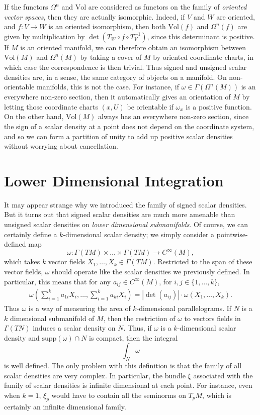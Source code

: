 If the functors $\Omega^n$ and $\text{Vol}$ are considered as functors on the family of \emph{oriented vector spaces}, then they are actually isomorphic. Indeed, if $V$ and $W$ are oriented, and $f: V \to W$ is an oriented isomorphism, then both $\text{Vol}(f)$ and $\Omega^n(f)$ are given by multiplication by $\det(T_W \circ f \circ T_V^{-1})$, since this determinant is positive. If $M$ is an oriented manifold, we can therefore obtain an isomorphism between $\text{Vol}(M)$ and $\Omega^n(M)$ by taking a cover of $M$ by oriented coordinate charts, in which case the correspondence is then trivial. Thus signed and unsigned scalar densities are, in a sense, the same category of objects on a manifold. On non-orientable manifolds, this is not the case. For instance, if $\omega \in \Gamma(\Omega^n(M))$ is an everywhere non-zero section, then it automatically gives an orientation of $M$ by letting those coordinate charts $(x,U)$ be orientable if $\omega_x$ is a positive function. On the other hand, $\text{Vol}(M)$ always has an everywhere non-zero section, since the sign of a scalar density at a point does not depend on the coordinate system, and so we can form a partition of unity to add up positive scalar densities without worrying about cancellation.

\section{Lower Dimensional Integration}

It may appear strange why we introduced the family of signed scalar densities. But it turns out that signed scalar densities are much more amenable than unsigned scalar densities on \emph{lower dimensional submanifolds}. Of course, we can certainly define a $k$-dimensional scalar density; we simply consider a pointwise-defined map
%
\[ \omega: \Gamma(TM) \times \dots \times \Gamma(TM) \to C^\infty(M), \]
%
which takes $k$ vector fields $X_1, \dots, X_k \in \Gamma(TM)$. Restricted to the span of these vector fields, $\omega$ should operate like the scalar densities we previously defined. In particular, this means that for any $a_{ij} \in C^\infty(M)$, for $i,j \in \{ 1, \dots, k \}$,
%
\begin{align*}
    \omega \left( \sum_{i = 1}^k a_{1i} X_i, \dots, \sum_{i = 1}^k a_{ki} X_i \right) = |\det(a_{ij})| \cdot \omega(X_1, \dots, X_k). 
\end{align*}
%
Thus $\omega$ is a way of measuring the area of $k$-dimensional parallelograms. If $N$ is a $k$ dimensional submanifold of $M$, then the restriction of $\omega$ to vectors fields in $\Gamma(TN)$ induces a scalar density on $N$. Thus, if $\omega$ is a $k$-dimensional scalar density and $\text{supp}(\omega) \cap N$ is compact, then the integral
%
\[ \int_N \omega \]
%
is well defined. The only problem with this definition is that the family of all scalar densities are very complex. In particular, the bundle $\xi$ associated with the family of scalar densities is infinite dimensional at each point. For instance, even when $k = 1$, $\xi_p$ would have to contain all the seminorms on $T_p M$, which is certainly an infinite dimensional family.

